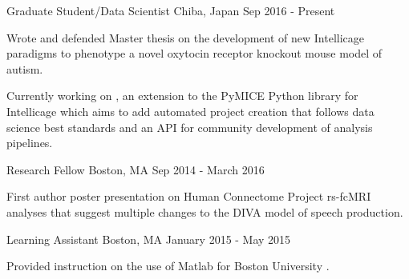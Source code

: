 \vspace*{0.35cm}

\begin{cventries}

    {Graduate Student/Data Scientist}
    {Chiba, Japan}
    {Sep 2016 - Present}
    {\begin{cvitems}
        \item{
            {Wrote} and 
            {defended} Master thesis on the development of new Intellicage paradigms to
            phenotype a novel oxytocin receptor knockout mouse model of autism.}
        \item{Currently working on , an extension to the
            PyMICE Python library for Intellicage which aims to add automated project
            creation that follows data science best standards and an API for community
            development of analysis pipelines.}
    \end{cvitems}}
    \vspace*{0.2cm}
    
    {Research Fellow}
    {Boston, MA}
    {Sep 2014 - March 2016}
    {\begin{cvitems}
        \item{First author 
            {poster presentation} on Human Connectome Project rs-fcMRI analyses that
            suggest multiple changes to the DIVA model of speech production.}
    \end{cvitems}}
    \vspace*{0.2cm}
    
    {Learning Assistant}
    {Boston, MA}
    {January 2015 - May 2015}
    {\begin{cvitems}
        \item{Provided instruction on the use of Matlab for Boston University
            .}
    \end{cvitems}}
    \vspace*{0.2cm}
    

\end{cventries}
